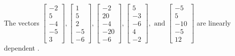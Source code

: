 \begin{exercise}
\begin{exerciseStatement}
  \end{exerciseStatement}
  \begin{exerciseAnswer}
   The vectors \(\left[\begin{array}{r}
-2 \\
5 \\
-4 \\
-5 \\
3
\end{array}\right] , \left[\begin{array}{r}
1 \\
5 \\
2 \\
-5 \\
-6
\end{array}\right] , \left[\begin{array}{r}
-2 \\
20 \\
-4 \\
-20 \\
-6
\end{array}\right] , \left[\begin{array}{r}
5 \\
-3 \\
-6 \\
4 \\
-2
\end{array}\right] , \text{ and } \left[\begin{array}{r}
-5 \\
5 \\
-10 \\
-5 \\
12
\end{array}\right]\) are 
  	 linearly dependent  .
  


  \end{exerciseAnswer}
\end{exercise}
